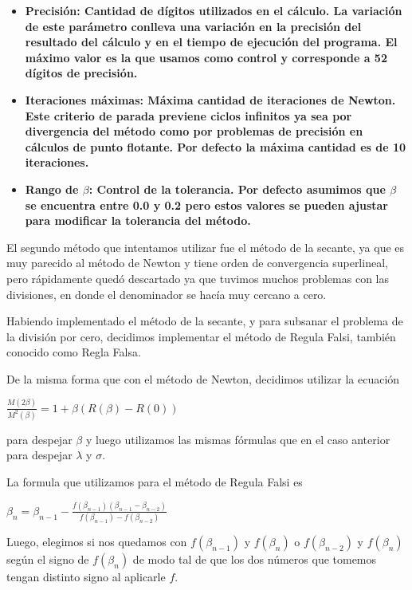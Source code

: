 \begin{itemize}

  \item \bf{Precisi\'on}: Cantidad de d\'igitos utilizados en el c\'alculo. La variaci\'on de este par\'ametro conlleva una variaci\'on en la precisi\'on del resultado del c\'alculo y en el tiempo de ejecuci\'on del programa. El m\'aximo valor es la que usamos como control y corresponde a 52 d\'igitos de precisi\'on.

  \item \bf{Iteraciones m\'aximas}: M\'axima cantidad de iteraciones de Newton. Este criterio de parada previene ciclos infinitos ya sea por divergencia del m\'etodo como por problemas de precisi\'on en c\'alculos de punto flotante. Por defecto la m\'axima cantidad es de 10 iteraciones.

  \item \bf{Rango de $\beta$}: Control de la tolerancia. Por defecto asumimos que $\beta$ se encuentra entre 0.0 y 0.2 pero estos valores se pueden ajustar para modificar la tolerancia del m\'etodo.

\end{itemize}

El segundo m\'etodo que intentamos utilizar fue el m\'etodo de la secante, ya que es muy parecido al m\'etodo de Newton y tiene orden de convergencia superlineal, pero r\'apidamente qued\'o descartado ya que tuvimos muchos problemas con las divisiones, en donde el denominador se hac\'ia muy cercano a cero.

Habiendo implementado el m\'etodo de la secante, y para subsanar el problema de la divisi\'on por cero, decidimos implementar el m\'etodo de Regula Falsi, tambi\'en conocido como Regla Falsa.

De la misma forma que con el m\'etodo de Newton, decidimos utilizar la ecuaci\'on

$\frac{M(2\beta)}{M^2(\beta)}=1 + \beta(R(\beta)-R(0))$

para despejar $\beta$ y luego utilizamos las mismas f\'ormulas que en el caso anterior para despejar $\lambda$ y $\sigma$.

La formula que utilizamos para el m\'etodo de Regula Falsi es

$\beta_n = \beta_{n-1} - \frac{f(\beta_{n-1}) (\beta_{n-1}-\beta_{n-2})}{f(\beta_{n-1}) - f(\beta_{n-2})}$

Luego, elegimos si nos quedamos con $f(\beta_{n-1})$ y $f(\beta_n)$ o $f(\beta_{n-2})$ y $f(\beta_n)$ seg\'un el signo de $f(\beta_n)$ de modo tal de que los dos n\'umeros que tomemos tengan distinto signo al aplicarle $f$.

